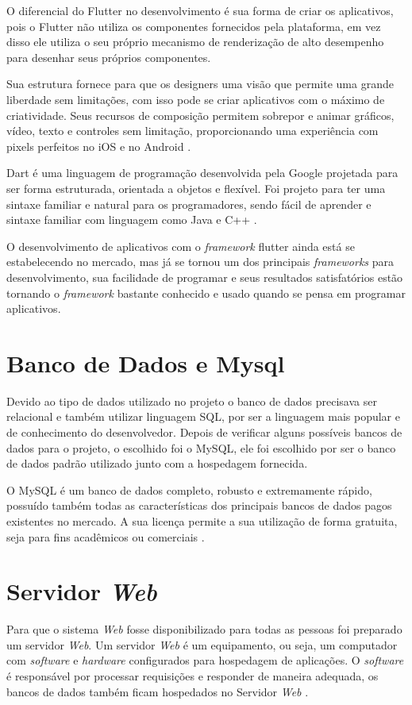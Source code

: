 \documentclass{ifto-tex}
\begin{document}
O diferencial do Flutter no desenvolvimento é sua forma de criar os aplicativos, pois o Flutter não utiliza os componentes fornecidos pela plataforma, em vez disso ele utiliza o seu próprio mecanismo de renderização de alto desempenho para desenhar seus próprios componentes. 

Sua estrutura fornece para que os designers uma visão que permite uma grande liberdade sem limitações, com isso pode se criar aplicativos com o máximo de criatividade. Seus recursos de composição permitem sobrepor e animar gráficos, vídeo, texto e controles sem limitação, proporcionando uma experiência com pixels perfeitos no iOS e no Android \cite{flutterf54:online}.

Dart é uma linguagem de programação desenvolvida pela Google projetada para ser forma estruturada, orientada a objetos e flexível. Foi projeto para ter uma sintaxe familiar e natural para os programadores, sendo fácil de aprender e sintaxe familiar com linguagem como Java e C++ \cite{DartNova22:online}.

O desenvolvimento de aplicativos com o \textit{framework} flutter ainda está se estabelecendo no mercado, mas já se tornou um dos principais \textit{frameworks} para desenvolvimento, sua facilidade de programar e seus resultados satisfatórios estão tornando o \textit{framework} bastante conhecido e usado quando se pensa em programar aplicativos.

\section{Banco de Dados e Mysql}
Devido ao tipo de dados utilizado no projeto o banco de dados precisava ser relacional e também utilizar linguagem SQL, por ser a linguagem mais popular e de conhecimento do desenvolvedor. Depois de verificar alguns possíveis bancos de dados para o projeto, o escolhido foi o MySQL, ele foi escolhido por ser o banco de dados padrão utilizado junto com a hospedagem fornecida.


O MySQL é um banco de dados completo, robusto e extremamente rápido, possuído também todas as características dos principais bancos de dados pagos existentes no mercado. A sua licença permite a sua utilização de forma gratuita, seja para fins acadêmicos ou comerciais \cite{milani2007mysql}.

\section{Servidor \textit{Web}}
Para que o sistema \textit{Web} fosse disponibilizado para todas as pessoas foi preparado um servidor \textit{Web}. Um servidor \textit{Web} é um equipamento, ou seja, um computador com \textit{software} e \textit{hardware} configurados para hospedagem de aplicações. O \textit{software} é responsável por processar requisições e responder de maneira adequada, os bancos de dados também ficam hospedados no Servidor \textit{Web}  \cite{OqueumS70:online}.
\end{document}
